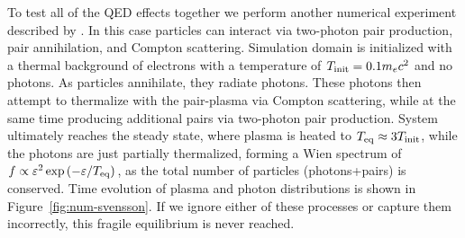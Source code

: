 \begin{figure}[htb]
\end{figure}

To test all of the QED effects together we perform another numerical experiment described by \cite{2020arXiv201107310B}. In this case particles can interact via two-photon pair production, pair annihilation, and Compton scattering. Simulation domain is initialized with a thermal background of electrons with a temperature of $T_{\rm init}=0.1 m_e c^2$ and no photons. As particles annihilate, they radiate photons. These photons then attempt to thermalize with the pair-plasma via Compton scattering, while at the same time producing additional pairs via two-photon pair production. System ultimately reaches the steady state, where plasma is heated to $T_{\rm eq}\approx 3T_{\rm init}$, while the photons are just partially thermalized, forming a Wien spectrum of $f\propto \varepsilon^2\exp{(-\varepsilon/T_{\rm eq})}$, as the total number of particles (photons+pairs) is conserved. Time evolution of plasma and photon distributions is shown in Figure~\ref{fig:num-svensson}. If we ignore either of these processes or capture them incorrectly, this fragile equilibrium is never reached.

